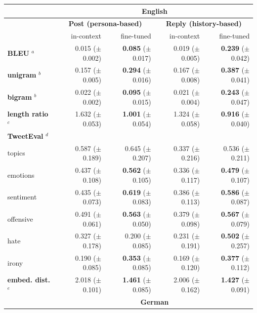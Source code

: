 \begin{table}[ht]
	\renewcommand{\arraystretch}{1.15}
	\centering
	\begin{tabular}{l | rr | rr}
		\toprule
		& \multicolumn{4}{c}{\textbf{English}} \\
        		\midrule
		& \multicolumn{2}{c|}{\textbf{Post (persona-based)}} & \multicolumn{2}{c}{\textbf{Reply (history-based)}} 
		\\
		& in-context & fine-tuned                   
        & in-context & fine-tuned             
		\\
		\midrule
        
		\textbf{BLEU} $^a$
		& 0.015 ($\pm$ 0.002)             & \textbf{0.085} ($\pm$ 0.017)          
        & 0.019 ($\pm$ 0.005)             & \textbf{0.239} ($\pm$ 0.042) 
		\\
		\textbf{unigram} $^b$
		& 0.157 ($\pm$ 0.005)             & \textbf{0.294} ($\pm$ 0.016)          
        & 0.167 ($\pm$ 0.008)             & \textbf{0.387} ($\pm$ 0.041) 
		\\
		\textbf{bigram} $^b$
		& 0.022 ($\pm$ 0.002)             & \textbf{0.095} ($\pm$ 0.015)          
        & 0.021 ($\pm$ 0.004)             & \textbf{0.243} ($\pm$ 0.047) 
		\\
		\textbf{length ratio} $^c$ 
		& 1.632 ($\pm$ 0.053)             & \textbf{1.001} ($\pm$ 0.054)          
        & 1.324 ($\pm$ 0.058)             & \textbf{0.916} ($\pm$ 0.040) 
		\\
		\midrule
		\textbf{TweetEval} $^d$ & & & &
		\\
		\quad topics
		& 0.587 ($\pm$ 0.189)             & 0.645 ($\pm$ 0.207)          
        & 0.337 ($\pm$ 0.216)             & 0.536 ($\pm$ 0.211)  
		\\
		\quad emotions 
		& 0.437 ($\pm$ 0.108)             & \textbf{0.562} ($\pm$ 0.105)          
        & 0.336 ($\pm$ 0.117)             & \textbf{0.479} ($\pm$ 0.107) 
		\\
		\quad sentiment 
		& 0.435 ($\pm$ 0.073)             & \textbf{0.619} ($\pm$ 0.083)          
        & 0.386 ($\pm$ 0.113)             & \textbf{0.586} ($\pm$ 0.087) 
		\\
		\quad offensive 
		& 0.491 ($\pm$ 0.061)             & \textbf{0.563} ($\pm$ 0.050)          
        & 0.379 ($\pm$ 0.098)             & \textbf{0.567} ($\pm$ 0.079) 
		\\
		\quad hate 
		& 0.327 ($\pm$ 0.178)             & 0.200 ($\pm$ 0.085)          
        & 0.231 ($\pm$ 0.191)             & \textbf{0.502} ($\pm$ 0.257) 
		\\
		\quad irony 
		& 0.190 ($\pm$ 0.085)             & \textbf{0.353} ($\pm$ 0.085)          
        & 0.169 ($\pm$ 0.120)             & \textbf{0.377} ($\pm$ 0.112) 
		\\
		\midrule
		\textbf{embed. dist.} $^e$ 
		& 2.018 ($\pm$ 0.101)             & \textbf{1.461} ($\pm$ 0.085)          
        & 2.006 ($\pm$ 0.162)             & \textbf{1.427} ($\pm$ 0.091) 
		\\
        \midrule
        		& \multicolumn{4}{c}{\textbf{German}} 
		\\


\end{tabular}
\end{table}

